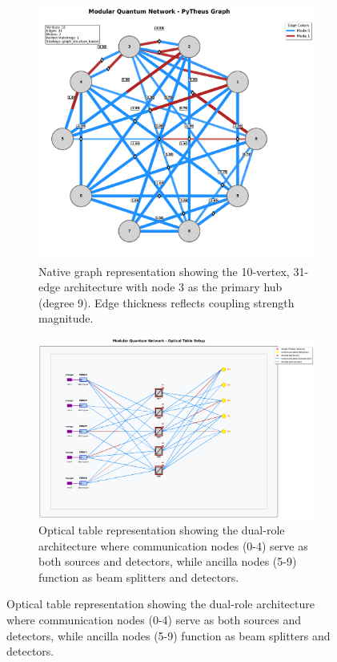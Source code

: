 \documentclass[11pt,a4paper]{article}
\begin{document}
\begin{figure}[htbp]
\centering
\begin{subfigure}{0.45\textwidth}
\includegraphics[width=\textwidth]{journal_5node_qkd_native_plot.png}
\caption{Native graph representation showing the 10-vertex, 31-edge architecture with node 3 as the primary hub (degree 9). Edge thickness reflects coupling strength magnitude.}
\label{fig:5node_qkd_native}
\end{subfigure}
\hfill
\begin{subfigure}{0.45\textwidth}
\includegraphics[width=\textwidth]{journal_5node_qkd_optical_table_setup.png}
\caption{Optical table representation showing the dual-role architecture where communication nodes (0-4) serve as both sources and detectors, while ancilla nodes (5-9) function as beam splitters and detectors.}

\end{subfigure}
\end{figure}
\end{document}
